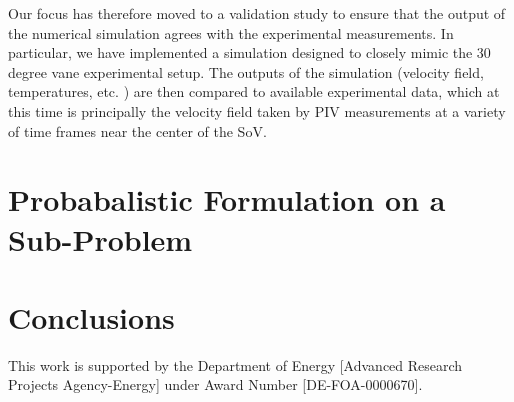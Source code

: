\documentclass{article}
\begin{document}
Our focus has therefore moved to a validation study to ensure that the output of the 
numerical simulation agrees with the experimental measurements. In particular, we have 
implemented a simulation designed to closely mimic the 30 degree vane
experimental setup. The  
outputs of the simulation (velocity field, temperatures, etc. ) are then
compared to available experimental data, which at this time is
principally the velocity field taken by PIV measurements at a variety of
time frames near the center of the SoV.  


%
%
%
\section{Probabalistic Formulation on a Sub-Problem}


%
%
%
\section{Conclusions}




%
%
\newpage
This work is supported by the Department of Energy [Advanced Research
Projects Agency-Energy] under Award Number [DE-FOA-0000670].   
\end{document}
